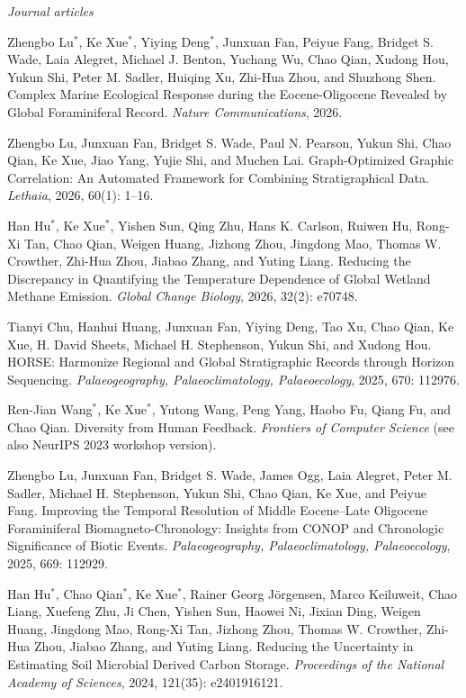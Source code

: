 \documentclass[11pt,a4paper]{article}
\begin{document}
\textit{Journal articles}
\begin{cvbullet}
  \item Zhengbo Lu$^*$, Ke Xue$^*$, Yiying Deng$^*$, Junxuan Fan, Peiyue Fang, Bridget S. Wade, Laia Alegret, Michael J. Benton, Yuchang Wu, Chao Qian, Xudong Hou, Yukun Shi, Peter M. Sadler, Huiqing Xu, Zhi-Hua Zhou, and Shuzhong Shen. Complex Marine Ecological Response during the Eocene-Oligocene Revealed by Global Foraminiferal Record. \textit{Nature Communications}, 2026.
  \item Zhengbo Lu, Junxuan Fan, Bridget S. Wade, Paul N. Pearson, Yukun Shi, Chao Qian, Ke Xue, Jiao Yang, Yujie Shi, and Muchen Lai. Graph-Optimized Graphic Correlation: An Automated Framework for Combining Stratigraphical Data. \textit{Lethaia}, 2026, 60(1): 1--16.
  \item Han Hu$^*$, Ke Xue$^*$, Yishen Sun, Qing Zhu, Hans K. Carlson, Ruiwen Hu, Rong-Xi Tan, Chao Qian, Weigen Huang, Jizhong Zhou, Jingdong Mao, Thomas W. Crowther, Zhi-Hua Zhou, Jiabao Zhang, and Yuting Liang. Reducing the Discrepancy in Quantifying the Temperature Dependence of Global Wetland Methane Emission. \textit{Global Change Biology}, 2026, 32(2): e70748.
  \item Tianyi Chu, Hanhui Huang, Junxuan Fan, Yiying Deng, Tao Xu, Chao Qian, Ke Xue, H. David Sheets, Michael H. Stephenson, Yukun Shi, and Xudong Hou. HORSE: Harmonize Regional and Global Stratigraphic Records through Horizon Sequencing. \textit{Palaeogeography, Palaeoclimatology, Palaeoecology}, 2025, 670: 112976.
  \item Ren-Jian Wang$^*$, Ke Xue$^*$, Yutong Wang, Peng Yang, Haobo Fu, Qiang Fu, and Chao Qian. Diversity from Human Feedback. \textit{Frontiers of Computer Science} (see also NeurIPS 2023 workshop version).
  \item Zhengbo Lu, Junxuan Fan, Bridget S. Wade, James Ogg, Laia Alegret, Peter M. Sadler, Michael H. Stephenson, Yukun Shi, Chao Qian, Ke Xue, and Peiyue Fang. Improving the Temporal Resolution of Middle Eocene--Late Oligocene Foraminiferal Biomagneto-Chronology: Insights from CONOP and Chronologic Significance of Biotic Events. \textit{Palaeogeography, Palaeoclimatology, Palaeoecology}, 2025, 669: 112929.
  \item Han Hu$^*$, Chao Qian$^*$, Ke Xue$^*$, Rainer Georg Jörgensen, Marco Keiluweit, Chao Liang, Xuefeng Zhu, Ji Chen, Yishen Sun, Haowei Ni, Jixian Ding, Weigen Huang, Jingdong Mao, Rong-Xi Tan, Jizhong Zhou, Thomas W. Crowther, Zhi-Hua Zhou, Jiabao Zhang, and Yuting Liang. Reducing the Uncertainty in Estimating Soil Microbial Derived Carbon Storage. \textit{Proceedings of the National Academy of Sciences}, 2024, 121(35): e2401916121.

\end{cvbullet}
\end{document}
